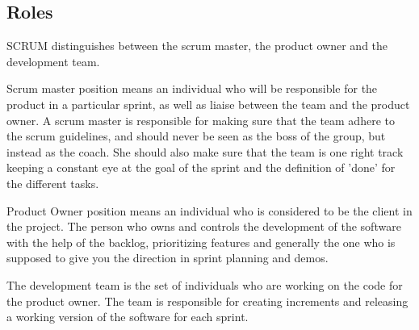 \subsection{Roles}

SCRUM distinguishes between the scrum master, the product owner and the development team.

Scrum master position means an individual who will be responsible for the product in a
particular sprint, as well as liaise between the team and the product owner.
A scrum master is responsible for making sure that the team adhere to the scrum guidelines,
and should never be seen as the boss of the group, but instead as the coach.
She should also make sure that the team is one right track keeping a constant eye at the goal
of the sprint and the definition of 'done' for the different tasks.

Product Owner position means an individual who is considered to be the client in the project.
The person who owns and controls the development of the software with the help of the backlog,
prioritizing features and generally the one who is supposed to give you the direction in sprint planning and demos.

The development team is the set of individuals who are working on the code for the product owner.
The team is responsible for creating increments and releasing a working version of the software
for each sprint.

